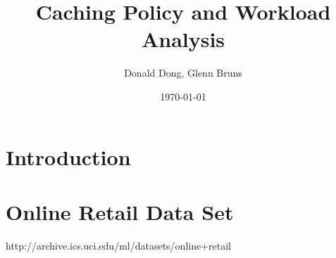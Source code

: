 \documentclass[a4paper,12pt]{article}
\title{Caching Policy and Workload Analysis}
\author{Donald Dong, Glenn Bruns}
\date{\today}
\begin{document}
\maketitle

\section{Introduction}

\section{Online Retail Data Set}
http://archive.ics.uci.edu/ml/datasets/online+retail
\end{document}
